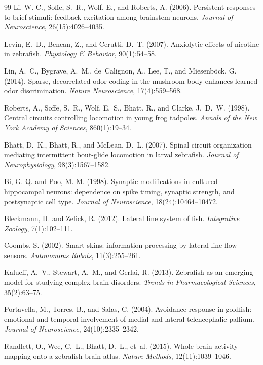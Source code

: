 \documentclass[12pt]{article}
\begin{document}
\begin{thebibliography}{99}
Li, W.-C., Soffe, S.~R., Wolf, E., and Roberts, A. (2006).
Persistent responses to brief stimuli: feedback excitation among brainstem neurons.
\textit{Journal of Neuroscience}, 26(15):4026--4035.

Levin, E.~D., Bencan, Z., and Cerutti, D.~T. (2007).
Anxiolytic effects of nicotine in zebrafish.
\textit{Physiology \& Behavior}, 90(1):54--58.

Lin, A.~C., Bygrave, A.~M., de~Calignon, A., Lee, T., and Miesenb{\"o}ck, G. (2014).
Sparse, decorrelated odor coding in the mushroom body enhances learned odor discrimination.
\textit{Nature Neuroscience}, 17(4):559--568.

Roberts, A., Soffe, S.~R., Wolf, E.~S., Bhatt, R., and Clarke, J.~D.~W. (1998).
Central circuits controlling locomotion in young frog tadpoles.
\textit{Annals of the New York Academy of Sciences}, 860(1):19--34.

Bhatt, D.~K., Bhatt, R., and McLean, D.~L. (2007).
Spinal circuit organization mediating intermittent bout-glide locomotion in larval zebrafish.
\textit{Journal of Neurophysiology}, 98(3):1567--1582.

Bi, G.-Q. and Poo, M.-M. (1998).
Synaptic modifications in cultured hippocampal neurons: dependence on spike timing, synaptic strength, and postsynaptic cell type.
\textit{Journal of Neuroscience}, 18(24):10464--10472.

Bleckmann, H. and Zelick, R. (2012).
Lateral line system of fish.
\textit{Integrative Zoology}, 7(1):102--111.

Coombs, S. (2002).
Smart skins: information processing by lateral line flow sensors.
\textit{Autonomous Robots}, 11(3):255--261.

Kalueff, A.~V., Stewart, A.~M., and Gerlai, R. (2013).
Zebrafish as an emerging model for studying complex brain disorders.
\textit{Trends in Pharmacological Sciences}, 35(2):63--75.

Portavella, M., Torres, B., and Salas, C. (2004).
Avoidance response in goldfish: emotional and temporal involvement of medial and lateral telencephalic pallium.
\textit{Journal of Neuroscience}, 24(10):2335--2342.

Randlett, O., Wee, C.~L., Bhatt, D.~L., et~al. (2015).
Whole-brain activity mapping onto a zebrafish brain atlas.
\textit{Nature Methods}, 12(11):1039--1046.

\end{thebibliography}
\endgroup
\end{document}
